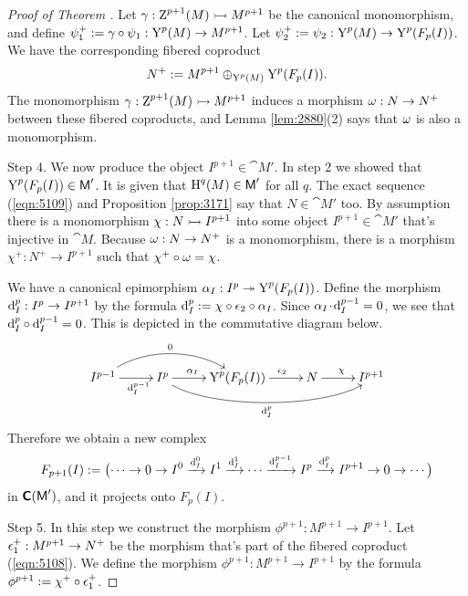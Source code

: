 \begin{proof}[Proof of Theorem \tup{\ref{thm:2880}}]
Let $\gamma : \operatorname{Z}^{p + 1}(M) \rightarrowtail M^{p + 1}$ be the canonical monomorphism,
and define 
$\psi_1^+ := \gamma \circ \psi_1 : \operatorname{Y}^{p}(M) \to M^{p + 1}$. 
Let 
$\psi_2^+ := \psi_2 :  \operatorname{Y}^p(M) \to \operatorname{Y}^{p}(F_p(I))$.
We have the corresponding fibered coproduct
\begin{equation} \label{eqn:5108}
N^+ := M^{p + 1} \oplus_{\operatorname{Y}^p(M)} \operatorname{Y}^{p}(F_p(I)) . 
\end{equation}
The monomorphism $\gamma : \operatorname{Z}^{p + 1}(M) \rightarrowtail M^{p + 1}$ induces a 
morphism $\omega : N \to N^+$ between these fibered coproducts, and Lemma 
\ref{lem:2880}(2) says that $\omega$ is also a monomorphism. 

\medskip \noindent
Step 4. We now produce the object $I^{p + 1} \in \cat{M}'$. 
In step 2 we showed that $\operatorname{Y}^{p}(F_p(I)) \in \operatorname{\mathsf{M}}'$. It is given that 
$\operatorname{H}^{q}(M) \in \operatorname{\mathsf{M}}'$ for all $q$. 
The exact sequence (\ref{eqn:5109}) and Proposition \ref{prop:3171} 
say that $N \in \cat{M}'$ too. 
By assumption there is a monomorphism
$\chi : N \rightarrowtail I^{p + 1}$
into some object  $I^{p + 1} \in \cat{M}'$ that's injective in $\cat{M}$. 
Because $\omega : N \to N^+$ is a monomorphism, there is a morphism 
$\chi^+ : N^+ \to I^{p + 1}$
such that $\chi^+ \circ \omega = \chi$. 

We have a canonical epimorphism $\alpha_I : I^{p} \twoheadrightarrow \operatorname{Y}^{p}(F_p(I))$. 
Define the morphism 
$\mathrm{d}_{I}^{p} : I^{p} \to I^{p + 1}$
by the formula 
$\mathrm{d}_{I}^{p} := \chi \circ \epsilon_2 \circ \alpha_I$. Since 
$\alpha_I \mspace{1.5mu}{\cdot}\mspace{1.5mu} \mathrm{d}_{I}^{p - 1} = 0$, we see that 
$\mathrm{d}_{I}^{p} \circ \mathrm{d}_{I}^{p - 1} = 0$. 
This is depicted in the commutative diagram below. 
\[ \UseTips \xymatrix @C=6ex @R=6ex {
I^{p - 1}
\ar[r]_(0.6){\d_I^{p - 1}}
\ar@(ur,ul)[rr]^{0}
&
I^p
\ar[r]^(0.4){\al_I}
\ar@(dr,dl)[rrr]_{\d_I^p}
&
\opn{Y}^{p}(F_p(I))
\ar[r]^(0.6){\ep_2}
&
N
\ar[r]^{\chi}
&
I^{p + 1}
} \]
Therefore we obtain a new complex 
\begin{equation} \label{eqn:5117}
F_{p + 1}(I) := \bigl( \cdots \to 0 \to I^0 \xrightarrow{\mathrm{d}_I^0} I^1 
\xrightarrow{\mathrm{d}_I^{1}} \cdots \xrightarrow{\mathrm{d}_I^{p - 1}} I^p 
\xrightarrow{\mathrm{d}_I^{p}} I^{p + 1} \to 0 \to \cdots \bigr) 
\end{equation}
in $\boldsymbol{\mathsf{C}}(\operatorname{\mathsf{M}}')$, and it projects onto $F_{p}(I)$. 

\medskip \noindent
Step 5. In this step we construct the morphism 
$\phi^{p + 1} : M^{p + 1} \to I^{p + 1}$. 
Let $\epsilon^+_1 : M^{p + 1} \to N^+$ be the morphism that's part of the fibered 
coproduct (\ref{eqn:5108}). 
We define the morphism 
$\phi^{p + 1} : M^{p + 1} \to I^{p + 1}$
by the formula 
$\phi^{p + 1} := \chi^+ \circ \epsilon_1^+$. 


\end{proof}

